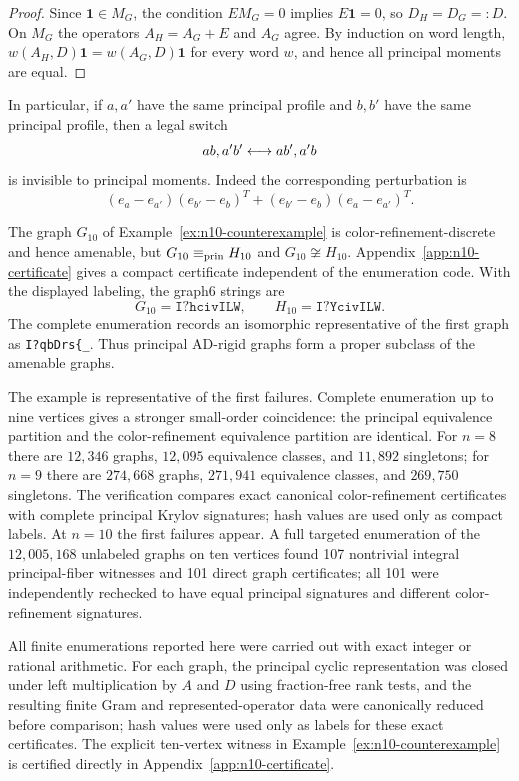 \documentclass[a4paper,fleqn]{cas-sc}
\theoremstyle{definition}
\theoremstyle{remark}
\newcommand{\one}{\mathbf 1}
\begin{document}
\begin{proof}
Since $\one\in M_G$, the condition $EM_G=0$ implies $E\one=0$, so $D_H=D_G=:D$.
On $M_G$ the operators $A_H=A_G+E$ and $A_G$ agree.  By induction on word length,
$w(A_H,D)\one=w(A_G,D)\one$ for every word $w$, and hence all principal moments
are equal.
\end{proof}

In particular, if $a,a'$ have the same principal profile and $b,b'$ have the same
principal profile, then a legal switch
\[
        ab,\\ a'b' \longleftrightarrow ab',\\ a'b
\]
is invisible to principal moments.  Indeed the corresponding perturbation is
\[
        (e_a-e_{a'})(e_{b'}-e_b)^T+(e_{b'}-e_b)(e_a-e_{a'})^T.
\]



The graph $G_{10}$ of Example~\ref{ex:n10-counterexample} is color-refinement-discrete and hence amenable, but
$G_{10}\equiv_{\rm prin}H_{10}$ and $G_{10}\not\cong H_{10}$.  Appendix~\ref{app:n10-certificate}
gives a compact certificate independent of the enumeration code.  With the
displayed labeling, the graph6 strings are
\[
        G_{10}=\texttt{I?hcivILW},
        \qquad
        H_{10}=\texttt{I?YcivILW}.
\]
The complete enumeration records an isomorphic representative of the first graph
as \texttt{I?qbDrs\{\_}.
Thus principal AD-rigid graphs form a proper subclass of the amenable graphs.



The example is representative of the first failures.  Complete enumeration up to
nine vertices gives a stronger small-order coincidence: the principal equivalence
partition and the color-refinement equivalence partition are identical.  For
$n=8$ there are $12{,}346$ graphs, $12{,}095$ equivalence classes, and $11{,}892$
singletons; for $n=9$ there are $274{,}668$ graphs, $271{,}941$ equivalence
classes, and $269{,}750$ singletons.  The verification compares exact canonical
color-refinement certificates with complete principal Krylov signatures; hash
values are used only as compact labels.  At $n=10$ the first failures appear.  A
full targeted enumeration of the $12{,}005{,}168$ unlabeled graphs on ten vertices
found 107 nontrivial integral principal-fiber witnesses and 101 direct graph
certificates; all 101 were independently rechecked to have equal principal
signatures and different color-refinement signatures.

All finite enumerations reported here were carried out with exact integer or
rational arithmetic.  For each graph, the principal cyclic representation was
closed under left multiplication by $A$ and $D$ using fraction-free rank tests,
and the resulting finite Gram and represented-operator data were canonically
reduced before comparison; hash values were used only as labels for these exact
certificates.  The explicit ten-vertex witness in Example~\ref{ex:n10-counterexample}
is certified directly in Appendix~\ref{app:n10-certificate}.
\end{document}
